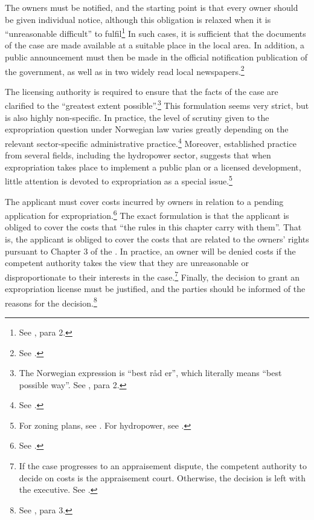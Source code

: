 The owners must be notified, and the starting point is that every owner should be given individual notice, although this obligation is relaxed when it is ``unreasonable difficult'' to fulfil\footnote{See \cite[12]{ea59}, para 2.} In such cases, it is sufficient that the documents of the case are made available at a suitable place in the local area. In addition, a public announcement must then  be made in the official notification publication of the government, as well as in two widely read local newspapers.\footnote{See \cite[12]{ea59}.}

The licensing authority is required to ensure that the facts of the case are clarified to the ``greatest extent possible''.\footnote{The Norwegian expression is ``best råd er'', which literally means ``best possible way''. See \cite[12]{ea59}, para 2.} This formulation seems very strict, but is also highly non-specific. In practice, the level of scrutiny given to the expropriation question under Norwegian law varies greatly depending on the relevant sector-specific administrative practice.\footnote{See \cite[380-381]{dyrkolbotn15}.} Moreover, established practice from several fields, including the hydropower sector, suggests that when expropriation takes place to implement a public plan or a licensed development, little attention is devoted to expropriation as a special issue.\footnote{For zoning plans, see \cite{namsos98,bo99}. For hydropower, see \cite{jorpeland11}.}

The applicant must cover costs incurred by owners in relation to a pending application for expropriation.\footnote{See \cite[15]{ea59}.} The exact formulation is that the applicant is obliged to cover the costs that ``the rules in this chapter carry with them''. That is, the applicant is obliged to cover the costs that are related to the owners' rights pursuant to Chapter 3 of the \cite{ea59}. In practice, an owner will be denied costs if the competent authority takes the view that they are unreasonable or disproportionate to their interests in the case.\footnote{If the case progresses to an appraisement dispute, the competent authority to decide on costs is the appraisement court. Otherwise, the decision is left with the executive. See \cite[15]{ea59}.} Finally, the decision to grant an expropriation license must be justified, and the parties should be informed of the reasons for the decision.\footnote{See \cite[12]{ea59}, para 3.}

